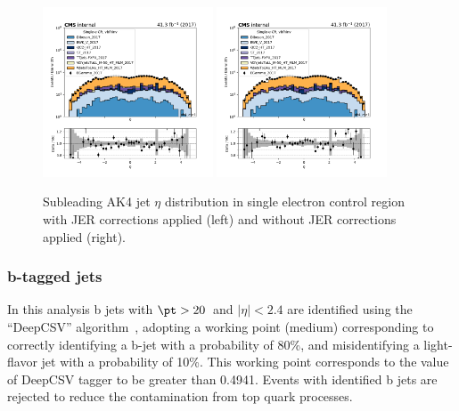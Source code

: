 \begin{figure}[htbp]
  \centering
        \includegraphics[width=0.45\textwidth]{fig/datamc/jer_comparison/cr_1e_vbf_ak4_eta1_losf_2017_jer.png}
        \includegraphics[width=0.45\textwidth]{fig/datamc/jer_comparison/cr_1e_vbf_ak4_eta1_losf_2017_nojer.png}
  \caption{Subleading AK4 jet $\eta$ distribution in single electron control region with JER corrections applied (left) 
  and without JER corrections applied (right).}
  \label{fig:jer_correction}
\end{figure}

\subsubsection{b-tagged jets}

In this analysis b jets with $\pt > 20$~\GeV and $|\eta| < 2.4$ are identified
using the ``DeepCSV'' algorithm~\cite{Sirunyan:2017ezt},
adopting a working point (medium) corresponding to correctly identifying a b-jet with a
probability of 80\%, and misidentifying a light-flavor jet with a probability of 10\%.
This working point corresponds to the value of DeepCSV tagger to be greater than 0.4941.
Events with identified b jets are rejected to reduce the contamination from top quark processes.


